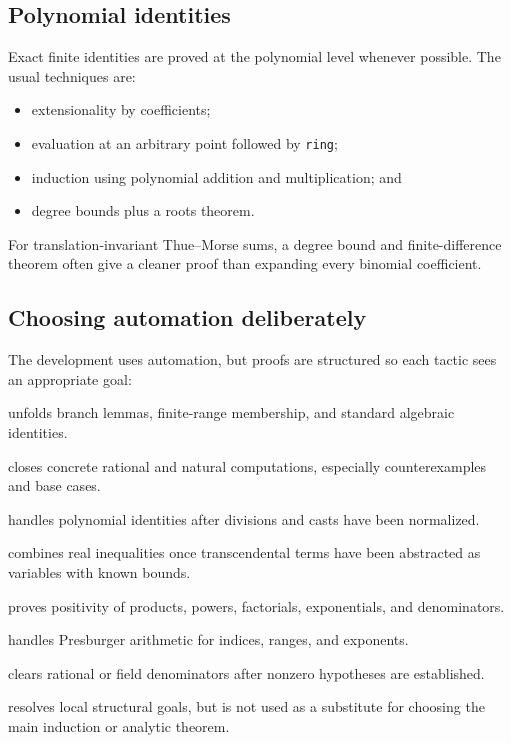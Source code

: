 \documentclass[11pt,oneside]{article}
\theoremstyle{definition}
\theoremstyle{remark}
\begin{document}
\subsection{Polynomial identities}
Exact finite identities are proved at the polynomial level whenever possible.  The usual techniques are:
\begin{itemize}
  \item extensionality by coefficients;
  \item evaluation at an arbitrary point followed by \nolinkurl{ring};
  \item induction using polynomial addition and multiplication; and
  \item degree bounds plus a roots theorem.
\end{itemize}
For translation-invariant Thue--Morse sums, a degree bound and finite-difference theorem often give a cleaner proof than expanding every binomial coefficient.

\subsection{Choosing automation deliberately}
The development uses automation, but proofs are structured so each tactic sees an appropriate goal:
\begin{description}[style=nextline,leftmargin=2.5em]
  \item[\texttt{simp}] unfolds branch lemmas, finite-range membership, and standard algebraic identities.
  \item[\texttt{norm\_num}] closes concrete rational and natural computations, especially counterexamples and base cases.
  \item[\texttt{ring} / \texttt{ring\_nf}] handles polynomial identities after divisions and casts have been normalized.
  \item[\texttt{linarith} / \texttt{nlinarith}] combines real inequalities once transcendental terms have been abstracted as variables with known bounds.
  \item[\texttt{positivity}] proves positivity of products, powers, factorials, exponentials, and denominators.
  \item[\texttt{omega}] handles Presburger arithmetic for indices, ranges, and exponents.
  \item[\texttt{field\_simp}] clears rational or field denominators after nonzero hypotheses are established.
  \item[\texttt{aesop}] resolves local structural goals, but is not used as a substitute for choosing the main induction or analytic theorem.
\end{description}
\end{document}
